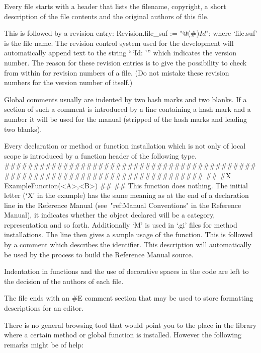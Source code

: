 
Every file starts with a header that lists the filename, copyright, a short
description of the file contents and the original authors of this file.

This is followed by a revision entry:
\begintt
Revision.file_suf :=
    "@(#)$Id$";
\endtt
where `file.suf' is the file name. The revision control system used for the
development will automatically append text to the string ``{`Id: '}'' which
indicates the version number. The reason for these revision entries is to
give the possibility to check from within {\GAP} for revision numbers of a
file. (Do not mistake these revision numbers for the version number of
{\GAP} itself.)

Global comments usually are indented by two hash marks and two blanks.
If a section of such a comment is introduced by a line containing
a hash mark and a number it will be used for the manual
(stripped of the hash marks and leading two blanks).

Every declaration or method or function installation which is not only of
local scope is introduced by a function header of the following type.
\begintt
#############################################################################
##
#X  ExampleFunction(<A>,<B>)
##
##  This function does nothing.
\endtt
The initial letter (`X' in the example) has the same meaning as at the end
of a declaration line in the Reference Manual (see~"ref:Manual Conventions"
in the Reference Manual),
it indicates whether the object declared will be a category, representation
and so forth.
Additionally `M' is used in `.gi' files for method installations.
The line then gives a sample usage of the function.
This is followed by a comment which describes the identifier.
This description will automatically be used by the process to build the
Reference Manual source.

Indentation in functions and the use of decorative spaces in the code are
left to the decision of the authors of each file.

The file ends with an 
\begintt
#E
\endtt
comment section that may be used to store formatting descriptions for an
editor.


There is no general browsing tool that would point you to the place in the
library where a certain method or global function is installed. However the
following remarks might be of help:

